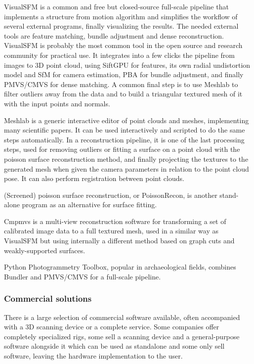VisualSFM \cite{wu2013towards} is a common and free but closed-source full-scale pipeline that implements a structure from motion algorithm and simplifies the workflow of several external programs, finally visualizing the results.
The needed external tools are feature matching, bundle adjustment and dense reconstruction.
VisualSFM is probably the most common tool in the open source and research community for practical use.
It integrates into a few clicks the pipeline from images to 3D point cloud, using SiftGPU for features, its own radial undistortion model and SfM for camera estimation, PBA for bundle adjustment, and finally PMVS/CMVS for dense matching.
A common final step is to use Meshlab to filter outliers away from the data and to build a triangular textured mesh of it with the input points and normals.

Meshlab \cite{meshlab} is a generic interactive editor of point clouds and meshes, implementing many scientific papers.
It can be used interactively and scripted to do the same steps automatically.
In a reconstruction pipeline, it is one of the last processing steps, used for removing outliers or fitting a surface on a point cloud with the poisson surface reconstruction method, and finally projecting the textures to the generated mesh when given the camera parameters in relation to the point cloud pose.
It can also perform registration between point clouds.

(Screened) poisson surface reconstruction, or PoissonRecon, is another stand-alone program as an alternative for surface fitting. \cite{kazhdan2013screened}

Cmpmvs is a multi-view reconstruction software for transforming a set of calibrated image data to a full textured mesh, used in a similar way as VisualSFM but using internally a different method based on graph cuts and weakly-supported surfaces.
\cite{jancosek2011multi}

Python Photogrammetry Toolbox, popular in archaeological fields, combines Bundler and PMVS/CMVS for a full-scale pipeline. \cite{moulon2011python}



\subsubsection{Commercial solutions} %

There is a large selection of commercial software available, often accompanied with a 3D scanning device or a complete service.
Some companies offer completely specialized rigs, some sell a scanning device and a general-purpose software alongside it which can be used as standalone and some only sell software, leaving the hardware implementation to the user.

